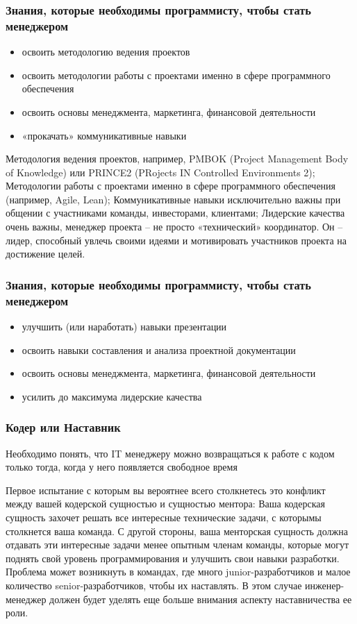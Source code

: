 \documentclass{../industrial-development}
\begin{document}
\begin{frame} \frametitle{Знания, которые необходимы программисту, чтобы стать менеджером}
\begin{itemize}
	\item освоить методологию ведения проектов
	\item освоить методологии работы с проектами именно в сфере программного обеспечения 
	\item освоить основы менеджмента, маркетинга, финансовой деятельности
	\item «прокачать» коммуникативные навыки
\end{itemize}
\end{frame}
\lecturenotes
Методология ведения проектов, например, PMBOK (Project Management Body of Knowledge) или PRINCE2 (PRojects IN Controlled Environments 2);
Методологии работы с проектами именно в сфере программного обеспечения (например, Agile, Lean);
Коммуникативные навыки исключительно важны при общении с участниками команды, инвесторами, клиентами;
Лидерские качества очень важны, менеджер проекта – не просто «технический» координатор. Он – лидер, способный увлечь своими идеями и мотивировать участников проекта на достижение целей.
~\cite{Best_qualities_for_IT-manager}

\begin{frame} \frametitle{Знания, которые необходимы программисту, чтобы стать менеджером}
	\begin{itemize}
		\item улучшить (или наработать) навыки презентации
		\item освоить навыки составления и анализа проектной документации
		\item освоить основы менеджмента, маркетинга, финансовой деятельности
		\item усилить до максимума лидерские качества
	\end{itemize}
\end{frame}
\lecturenotes
\begin{frame} \frametitle{Кодер или Наставник}
	Необходимо понять, что IT менеджеру можно возвращаться к работе с кодом только тогда, когда у него появляется свободное время
\end{frame}
\lecturenotes
Первое испытание с которым вы вероятнее всего столкнетесь это конфликт между вашей кодерской сущностью и сущностью ментора: Ваша кодерская сущность захочет решать все интересные технические задачи, с которымы столкнется ваша команда. С другой стороны, ваша менторская сущность должна отдавать эти интересные задачи менее опытным членам команды, которые могут поднять свой уровень программирования и улучшить свои навыки разработки.
Проблема может возникнуть в командах, где много junior-разработчиков и малое количество senior-разработчиков, чтобы их наставлять. В этом случае инженер-менеджер должен будет уделять еще больше внимания аспекту наставничества ее роли.
~\cite{From_engineer_to_manager_keeping_your_technical_skills}
\end{document}
